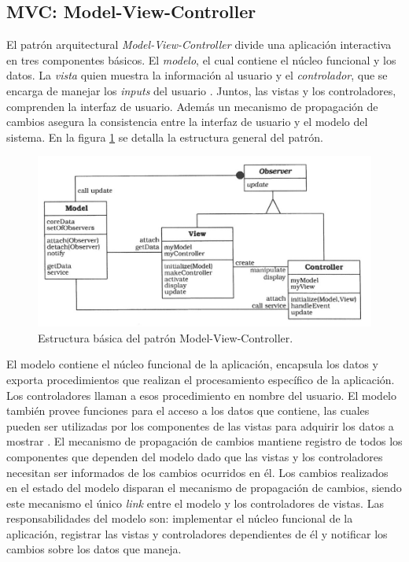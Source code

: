 \subsection{MVC: Model-View-Controller}
El patr\'on arquitectural \textit{Model-View-Controller} divide una aplicaci\'on interactiva en tres componentes b\'asicos. El \textit{modelo}, el cual contiene el n\'ucleo funcional y los datos. La \textit{vista} quien muestra la informaci\'on al usuario y el \textit{controlador}, que se encarga de manejar los \textit{inputs} del usuario \cite{patarq}. Juntos, las vistas y los controladores, comprenden la interfaz de usuario. Adem\'as un mecanismo de propagaci\'on de cambios asegura la consistencia entre la interfaz de usuario y el modelo del sistema. En la figura \ref{fig:mvcdiagrama} se detalla la estructura general del patr\'on.\\
\begin{figure}[H]
	\includegraphics[width=\textwidth]{imagenes/MVC}
	\caption{Estructura b\'asica del patr\'on Model-View-Controller.}
	\label{fig:mvcdiagrama}
\end{figure}
El modelo contiene el n\'ucleo funcional de la aplicaci\'on, encapsula los datos y exporta procedimientos que realizan el procesamiento espec\'ifico de la aplicaci\'on. Los controladores llaman a esos procedimiento en nombre del usuario. El modelo tambi\'en provee funciones para el acceso a los datos que contiene, las cuales pueden ser utilizadas por los componentes de las vistas para adquirir los datos a mostrar \cite{patarq}. El mecanismo de propagaci\'on de cambios mantiene registro de todos los componentes que dependen del modelo dado que las vistas y los controladores necesitan ser informados de los cambios ocurridos en \'el. Los cambios realizados en el estado del modelo disparan el mecanismo de propagaci\'on de cambios, siendo este mecanismo el \'unico \textit{link} entre el modelo y los controladores de vistas. Las responsabilidades del modelo son: implementar el n\'ucleo funcional de la aplicaci\'on, registrar las vistas y controladores dependientes de \'el y notificar los cambios sobre los datos que maneja.


